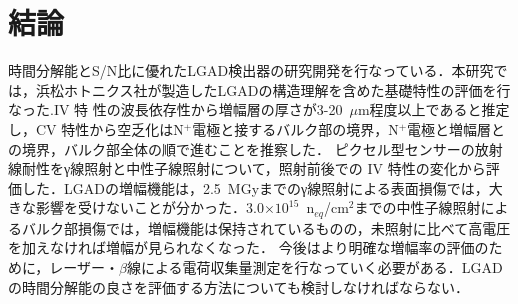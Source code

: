 \chapter{結論}
時間分解能とS/N比に優れたLGAD検出器の研究開発を行なっている．本研究では，浜松ホトニクス社が製造したLGADの構造理解を含めた基礎特性の評価を行なった.IV 特 性の波長依存性から増幅層の厚さが3-20~$\mu$m程度以上であると推定し，CV 特性から空乏化はN$^{+}$電極と接するバルク部の境界，N$^{+}$電極と増幅層との境界，バルク部全体の順で進むことを推察した．
ピクセル型センサーの放射線耐性をγ線照射と中性子線照射について，照射前後での IV 特性の変化から評価した．LGADの増幅機能は，2.5~MGyまでのγ線照射による表面損傷では，大きな影響を受けないことが分かった．3.0$\times10^{15}$~n$_{eq}$/cm$^{2}$までの中性子線照射によるバルク部損傷では，増幅機能は保持されているものの，未照射に比べて高電圧を加えなければ増幅が見られなくなった．
今後はより明確な増幅率の評価のために，レーザー・$\beta$線による電荷収集量測定を行なっていく必要がある．LGADの時間分解能の良さを評価する方法についても検討しなければならない．